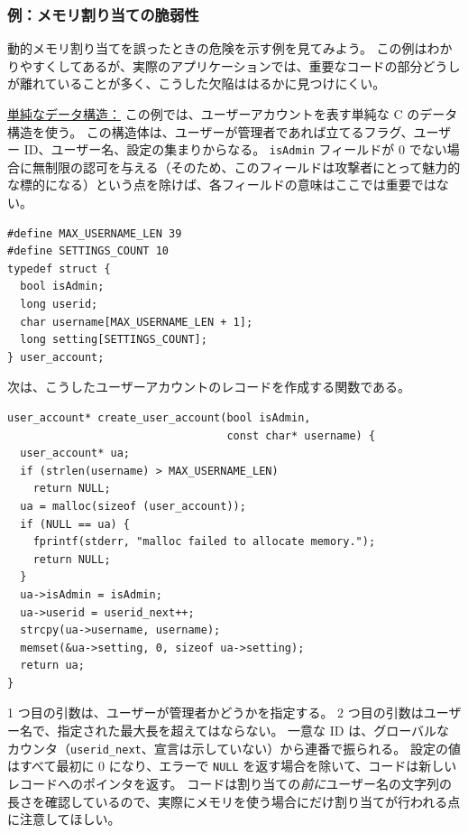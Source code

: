\documentclass[uplatex]{jsarticle}
\def\label#1{}%
\begin{document}
\subsubsection{例：メモリ割り当ての脆弱性}\label{subsec:ch9-example-memory-allocation}

動的メモリ割り当てを誤ったときの危険を示す例を見てみよう。
この例はわかりやすくしてあるが、実際のアプリケーションでは、重要なコードの部分どうしが離れていることが多く、こうした欠陥ははるかに見つけにくい。

\underline{単純なデータ構造：}
この例では、ユーザーアカウントを表す単純な C のデータ構造を使う。
この構造体は、ユーザーが管理者であれば立てるフラグ、ユーザー ID、ユーザー名、設定の集まりからなる。
\texttt{isAdmin} フィールドが 0 でない場合に無制限の認可を与える（そのため、このフィールドは攻撃者にとって魅力的な標的になる）という点を除けば、各フィールドの意味はここでは重要ではない。

\begin{verbatim}
#define MAX_USERNAME_LEN 39
#define SETTINGS_COUNT 10
typedef struct {
  bool isAdmin;
  long userid;
  char username[MAX_USERNAME_LEN + 1];
  long setting[SETTINGS_COUNT];
} user_account;
\end{verbatim}

次は、こうしたユーザーアカウントのレコードを作成する関数である。

\begin{verbatim}
user_account* create_user_account(bool isAdmin,
                                  const char* username) {
  user_account* ua;
  if (strlen(username) > MAX_USERNAME_LEN)
    return NULL;
  ua = malloc(sizeof (user_account));
  if (NULL == ua) {
    fprintf(stderr, "malloc failed to allocate memory.");
    return NULL;
  }
  ua->isAdmin = isAdmin;
  ua->userid = userid_next++;
  strcpy(ua->username, username);
  memset(&ua->setting, 0, sizeof ua->setting);
  return ua;
}
\end{verbatim}

1 つ目の引数は、ユーザーが管理者かどうかを指定する。
2 つ目の引数はユーザー名で、指定された最大長を超えてはならない。
一意な ID は、グローバルなカウンタ（\texttt{userid\_next}、宣言は示していない）から連番で振られる。
設定の値はすべて最初に 0 になり、エラーで \texttt{NULL} を返す場合を除いて、コードは新しいレコードへのポインタを返す。
コードは割り当ての\emph{前に}ユーザー名の文字列の長さを確認しているので、実際にメモリを使う場合にだけ割り当てが行われる点に注意してほしい。
\end{document}
